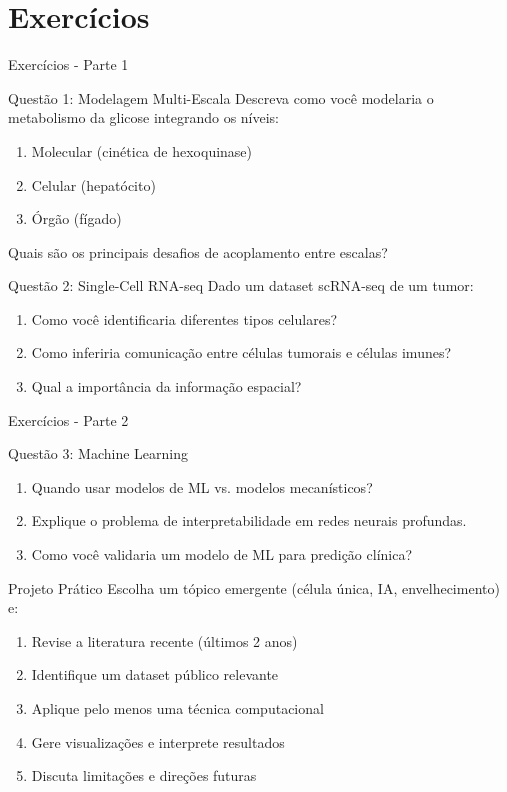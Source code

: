 \section{Exercícios}

\begin{frame}{Exercícios - Parte 1}
\begin{block}{Questão 1: Modelagem Multi-Escala}
Descreva como você modelaria o metabolismo da glicose integrando os níveis:
\begin{enumerate}
    \item Molecular (cinética de hexoquinase)
    \item Celular (hepatócito)
    \item Órgão (fígado)
\end{enumerate}
Quais são os principais desafios de acoplamento entre escalas?
\end{block}

\begin{block}{Questão 2: Single-Cell RNA-seq}
Dado um dataset scRNA-seq de um tumor:
\begin{enumerate}
    \item Como você identificaria diferentes tipos celulares?
    \item Como inferiria comunicação entre células tumorais e células imunes?
    \item Qual a importância da informação espacial?
\end{enumerate}
\end{block}
\end{frame}

\begin{frame}{Exercícios - Parte 2}
\begin{block}{Questão 3: Machine Learning}
\begin{enumerate}
    \item Quando usar modelos de ML vs. modelos mecanísticos?
    \item Explique o problema de interpretabilidade em redes neurais profundas.
    \item Como você validaria um modelo de ML para predição clínica?
\end{enumerate}
\end{block}

\begin{alertblock}{Projeto Prático}
Escolha um tópico emergente (célula única, IA, envelhecimento) e:
\begin{enumerate}
    \item Revise a literatura recente (últimos 2 anos)
    \item Identifique um dataset público relevante
    \item Aplique pelo menos uma técnica computacional
    \item Gere visualizações e interprete resultados
    \item Discuta limitações e direções futuras
\end{enumerate}
\end{alertblock}
\end{frame}

